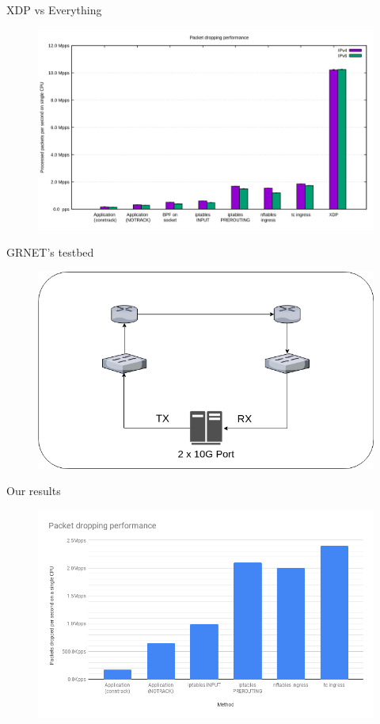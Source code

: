 \documentclass{beamer}
\begin{document}
\begin{frame}{XDP vs Everything}
  \begin{figure}
    \includegraphics[width=1.1\textwidth]{./with_xdp.png}
  \end{figure}
\end{frame}

\begin{frame}{GRNET's testbed}
  \begin{figure}
    \includegraphics[width=1\textwidth]{./testbench.png}
  \end{figure}
\end{frame}

\begin{frame}{Our results}
  \begin{figure}
    \includegraphics[width=1.1\textwidth]{./custom_no_xdp.png}
  \end{figure}
\end{frame}
\end{document}
